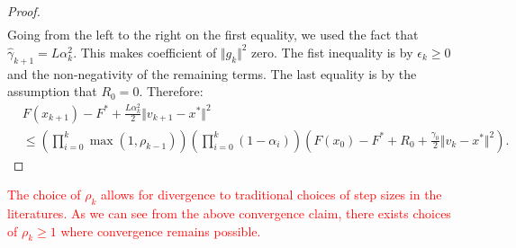 \documentclass[12pt]{article}
\begin{document}
\begin{proof}
\begin{align*}
        \end{align*}
        Going from the left to the right on the first equality, we used the fact that $\hat \gamma_{k + 1} = L \alpha_{k}^2$.
        This makes coefficient of $\Vert g_k\Vert^2$ zero. 
        The fist inequality is by $\epsilon_k \ge 0$ and the non-negativity of the remaining terms. 
        The last equality is by the assumption that $R_0 = 0$. 
        Therefore: 
        {\small
        \begin{align*}
            & F(x_{k + 1}) - F^* +
            \frac{L\alpha_k^2}{2}\Vert v_{k + 1} - x^*\Vert^2
            \\
            &\le 
            \left(
                \prod_{i = 0}^{k} \max(1, \rho_{k - 1})
            \right)
            \left(
                \prod_{i = 0}^{k} \left(1  - \alpha_i\right)
            \right)
            \left(
                F(x_0) - F^* + R_0 + \frac{\gamma_0}{2}\Vert v_k - x^*\Vert^2
            \right). 
        \end{align*}
        }
    \end{proof}
    \begin{remark}        
        \textcolor{red}
        {
            The choice of $\rho_k$ allows for divergence to traditional choices of step sizes in the literatures. 
            As we can see from the above convergence claim, there exists choices of $\rho_k\ge 1$ where convergence remains possible. 
        }
    \end{remark}
\end{document}
